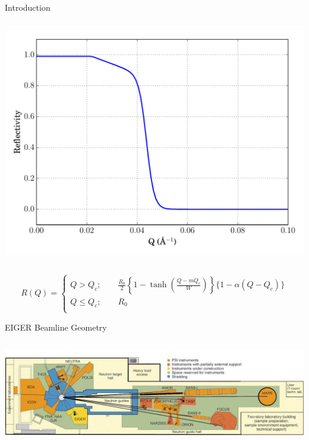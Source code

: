 \documentclass[final,t]{beamer}
\begin{document}
\begin{frame}{}
\begin{columns}[t]
\begin{column}{.3\linewidth}
\begin{block}{Introduction}
\begin{columns}
\begin{column}{.4\linewidth}
    \includegraphics*[width=\linewidth]{reflectivity_curve.pdf}

\end{column}
\end{columns}
\vspace{2ex}
\begin{equation}\label{eq:ref}
        R(Q) = 
        \begin{cases}
            Q > Q_c;  \qquad \frac{R_0}{2}\left\{  1 - \tanh\left(  \frac{Q - m Q_c}{W}\right) \right\}\{1-\alpha(Q-Q_c)\} \\
            Q \leq Q_c; \qquad R_0 \\
        \end{cases}
    \end{equation}

      \end{block}

      \begin{block}{EIGER Beamline Geometry}
      
        \begin{columns}[T]
          \begin{column}{.75\linewidth}
        
        \includegraphics*[width=\linewidth]{exp.jpg}


\end{column}
\end{columns}
\end{block}
\end{column}
\end{columns}
\end{frame}
\end{document}
